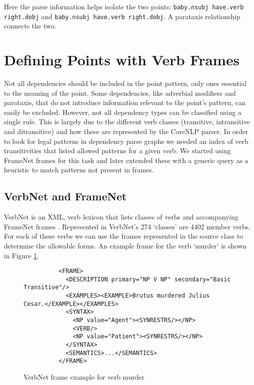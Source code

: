     Here the parse information helps isolate the two points: \texttt{baby.nsubj have.verb right.dobj} and \texttt{baby.nsubj have.verb right.dobj}. A parataxis relationship connects the two.

  \section{Defining Points with Verb Frames}
  Not all dependencies should be included in the point pattern, only ones essential to the meaning of the point. Some dependencies, like adverbial modifiers and parataxis, that do not introduce information relevant to the point's pattern, can easily be excluded. However, not all dependency types can be classified using a single rule. This is largely due to the different verb classes (transitive, intransitive and ditransitive) and how these are represented by the CoreNLP parser. In order to look for legal patterns in dependency parse graphs we needed an index of verb transitivities that listed allowed patterns for a given verb. We started using FrameNet frames for this task and later extended these with a generic query as a heuristic to match patterns not present in frames.

    \tocless\subsection{VerbNet and FrameNet}
      VerbNet is an XML, verb lexicon that lists classes of verbs and accompanying FrameNet frames \cite{schuler2005verbnet,fillmore2002framenet}. Represented in VerbNet's 274 `classes' are 4402 member verbs. For each of these verbs we can use the frames represented in the source class to determine the allowable forms. An example frame for the verb `murder' is shown in Figure \ref{fig:murder-frame}.

      \begin{figure}
        \centering
        \caption{VerbNet frame example for verb murder}

        \lstset{language=XML}
        \begin{lstlisting}
          <FRAME>
            <DESCRIPTION primary="NP V NP" secondary="Basic Transitive"/>
            <EXAMPLES><EXAMPLE>Brutus murdered Julius Cesar.</EXAMPLE></EXAMPLES>
            <SYNTAX>
              <NP value="Agent"><SYNRESTRS/></NP>
              <VERB/>
              <NP value="Patient"><SYNRESTRS/></NP>
            </SYNTAX>
            <SEMANTICS>...</SEMANTICS>
          </FRAME>
        \end{lstlisting}
        \label{fig:murder-frame}
      \end{figure}

